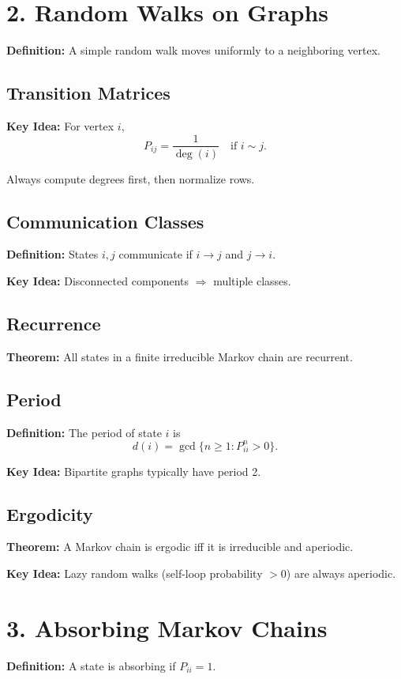 \documentclass[11pt]{article}
\newcommand{\defn}[1]{\textcolor{mygreen}{\textbf{Definition:} #1}}
\newcommand{\thm}[1]{\textcolor{mygreen}{\textbf{Theorem:} #1}}
\newcommand{\idea}[1]{\textcolor{mygreen}{\textbf{Key Idea:} #1}}
\begin{document}
\section*{2. Random Walks on Graphs}

\defn{A simple random walk moves uniformly to a neighboring vertex.}

\subsection*{Transition Matrices}
\idea{For vertex $i$,
\[
P_{ij} = \frac{1}{\deg(i)} \quad \text{if } i \sim j.
\]}

Always compute degrees first, then normalize rows.

\subsection*{Communication Classes}
\defn{States $i,j$ communicate if $i \to j$ and $j \to i$.}

\idea{Disconnected components $\Rightarrow$ multiple classes.}

\subsection*{Recurrence}
\thm{All states in a finite irreducible Markov chain are recurrent.}

\subsection*{Period}
\defn{The period of state $i$ is
\[
d(i) = \gcd\{n \ge 1 : P^n_{ii} > 0\}.
\]}

\idea{Bipartite graphs typically have period 2.}

\subsection*{Ergodicity}
\thm{A Markov chain is ergodic iff it is irreducible and aperiodic.}

\idea{Lazy random walks (self-loop probability $>0$) are always aperiodic.}

\section*{3. Absorbing Markov Chains}

\defn{A state is absorbing if $P_{ii}=1$.}
\end{document}
